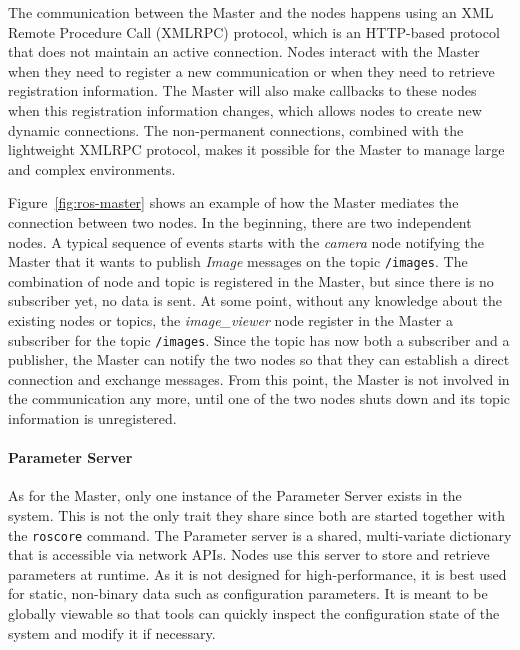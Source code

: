 The communication between the Master and the nodes happens using an XML Remote Procedure Call (XMLRPC) protocol, which is an HTTP-based protocol that does not maintain an active connection. Nodes interact with the Master when they need to register a new communication or when they need to retrieve registration information. The Master will also make callbacks to these nodes when this registration information changes, which allows nodes to create new dynamic connections. The non-permanent connections, combined with the lightweight XMLRPC protocol, makes it possible for the Master to manage large and complex environments.

Figure~\ref{fig:ros-master} shows an example of how the Master mediates the connection between two nodes. In the beginning, there are two independent nodes. A typical sequence of events starts with the \textit{camera} node notifying the Master that it wants to publish \textit{Image} messages on the topic \texttt{/images}. The combination of node and topic is registered in the Master, but since there is no subscriber yet, no data is sent. At some point, without any knowledge about the existing nodes or topics, the \textit{image\_viewer} node register in the Master a subscriber for the topic \texttt{/images}. Since the topic has now both a subscriber and a publisher, the Master can notify the two nodes so that they can establish a direct connection and exchange messages. From this point, the Master is not involved in the communication any more, until one of the two nodes shuts down and its topic information is unregistered.

\paragraph{Parameter Server}  As for the Master, only one instance of the Parameter Server exists in the system. This is not the only trait they share since both are started together with the \texttt{roscore} command. The Parameter server is a shared, multi-variate dictionary that is accessible via network APIs. Nodes use this server to store and retrieve parameters at runtime. As it is not designed for high-performance, it is best used for static, non-binary data such as configuration parameters. It is meant to be globally viewable so that tools can quickly inspect the configuration state of the system and modify it if necessary.

